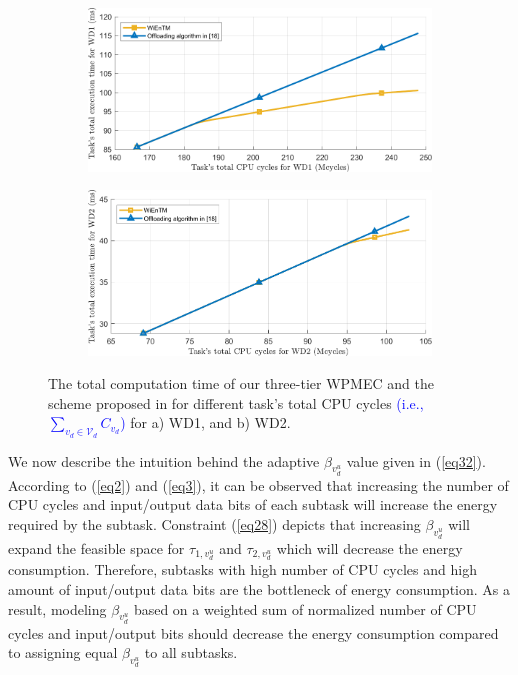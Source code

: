 \documentclass[12pt,draftclsnofoot,onecolumn]{IEEEtran}
\begin{document}
\begin{figure}
	\centering
	\begin{subfigure}[b]{.39\textwidth}
		\centering
		\includegraphics[width=\linewidth]{simulation2_a1.pdf}
		\caption{} \label{fig:7a1}
	\end{subfigure}
	\begin{subfigure}[b]{.39\textwidth}
		\centering
		\includegraphics[width=\linewidth]{simulation2_b1.pdf}
		\caption{} \label{fig:7b1}
	\end{subfigure}
	
	\caption{The total computation time of our three-tier WPMEC and the scheme proposed in \cite{b13} for different task's total CPU cycles \textcolor{blue}{(i.e., $\sum_{v_d\in\mathcal{V}_d}C_{v_d}$)} for a) WD1, and b) WD2.} \label{fig:71}
\end{figure}

We now describe the intuition behind the adaptive $\beta_{v_d^u}$ value given in (\ref{eq32}). According to (\ref{eq2}) and (\ref{eq3}), it can be observed that increasing the number of CPU cycles and input/output data bits of each subtask will increase the energy required by the subtask. Constraint (\ref{eq28}) depicts that increasing $\beta_{v_d^u}$ will expand the feasible space for $\tau_{1,v_d^u}$ and $\tau_{2,v_d^u}$ which will decrease the energy consumption. Therefore, subtasks with high number of CPU cycles and high amount of input/output data bits are the bottleneck of energy consumption. As a result, modeling $\beta_{v_d^u}$ based on a weighted sum of normalized number of CPU cycles and input/output bits should decrease the energy consumption compared to assigning equal $\beta_{v_d^u}$ to all subtasks. 
\end{document}
